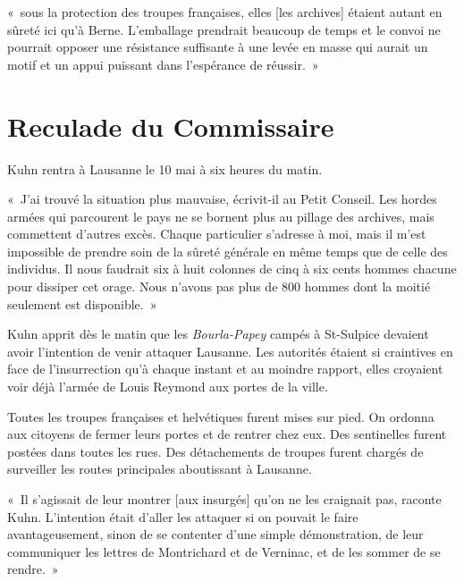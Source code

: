 \documentclass[french,twoside]{book} %
\newenvironment{quoteblock}%
  {\begin{quoting}}
  {\end{quoting}}
\newenvironment{quotebar}{%
    \def\FrameCommand{{\color{rubric!10!}\vrule width 0.5em} \hspace{0.9em}}%
    \def\OuterFrameSep{\itemsep} %
    \MakeFramed {\advance\hsize-\width \FrameRestore}
  }%
  {%
    \endMakeFramed
  }
\renewenvironment{quoteblock}%
  {%
    \savenotes
    \setstretch{0.9}
    \normalfont
    \begin{quotebar}
  }
  {%
    \end{quotebar}
    \spewnotes
  }
\begin{document}
\begin{quoteblock}
\noindent « sous la protection des troupes françaises, elles [les archives] étaient autant en sûreté ici qu’à Berne. L’emballage prendrait beaucoup de temps et le convoi ne pourrait opposer une résistance suffisante à une levée en masse qui aurait un motif et un appui puissant dans l’espérance de réussir. »\end{quoteblock}

\section[Reculade du Commissaire]{Reculade du Commissaire}
\noindent Kuhn rentra à Lausanne le 10 mai à six heures du matin.\par

\begin{quoteblock}
 \noindent « J’ai trouvé la situation plus mauvaise, écrivit-il au Petit Conseil. Les hordes armées qui parcourent le pays ne se bornent plus au pillage des archives, mais commettent d’autres excès. Chaque particulier s’adresse à moi, mais il m’est impossible de prendre soin de la sûreté générale en même temps que de celle des individus. Il nous faudrait six à huit colonnes de cinq à six cents hommes chacune pour dissiper cet orage. Nous n’avons pas plus de 800 hommes dont la moitié seulement est disponible. »
 \end{quoteblock}

\noindent Kuhn apprit dès le matin que les \emph{Bourla-Papey} campés à St-Sulpice devaient avoir l’intention de venir attaquer Lausanne. Les autorités étaient si craintives en face de l’insurrection qu’à chaque instant et au moindre rapport, elles croyaient voir déjà l’armée de Louis Reymond aux portes de la ville.\par
Toutes les troupes françaises et helvétiques furent mises sur pied. On ordonna aux citoyens de fermer leurs portes et de rentrer chez eux. Des sentinelles furent postées dans toutes les rues. Des détachements de troupes furent chargés de surveiller les routes principales aboutissant à Lausanne.\par

\begin{quoteblock}
 \noindent « Il s’agissait de leur montrer [aux insurgés] qu’on ne les craignait pas, raconte Kuhn. L’intention était d’aller les attaquer si on pouvait le faire avantageusement, sinon de se contenter d’une simple démonstration, de leur communiquer les lettres de Montrichard et de Verninac, et de les sommer de se rendre. »
 \end{quoteblock}
\end{document}
